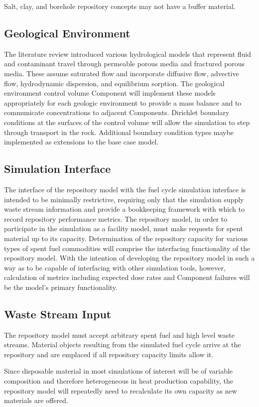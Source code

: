 Salt, clay, and borehole repository concepts may not have a buffer 
material.

\subsection{Geological Environment}

The literature review introduced various hydrological models that represent
fluid and contaminant travel through permeable porous media and fractured porous 
media. These assume saturated flow and incorporate diffusive flow, advective 
flow, hydrodynamic dispersion, and equilibrium sorption. The geological 
environment control volume Component will implement these models appropriately 
for each geologic environment to provide a mass balance and to communicate concentrations to  
adjacent Components.  Dirichlet boundary conditions at the surfaces of the 
control volume will allow the simulation to step through transport in the rock. 
Additional boundary condition types maybe implemented as extensions to the base 
case model.


\subsection{Simulation Interface}

The interface of the repository model with the \Cyclus fuel cycle 
simulation interface is intended to be minimally restrictive, 
requiring only that the simulation supply waste stream information and 
provide a bookkeeping framework with which to record repository 
performance metrics. The repository model, in order to participate in the 
simulation as a facility model, must make requests for spent material up 
to its capacity. Determination of the repository capacity for various 
types of spent fuel commodities will comprise the interfacing functionality of 
the repository model. With the intention of developing the repository model in 
such a way as to be capable of interfacing with other simulation tools, however, 
calculation of metrics including expected dose rates and 
Component failures will be the model's primary functionality. 

\subsection{Waste Stream Input}

The repository model must accept arbitrary spent fuel and high level waste
streams.  Material objects resulting from the simulated fuel cycle arrive at 
the  repository and are emplaced if all repository capacity limits allow 
it.

Since disposable material in most simulations of interest will be of variable 
composition and therefore heterogeneous in heat production capability, the 
repository model will repeatedly need to recalculate its own capacity as 
new materials are offered.

